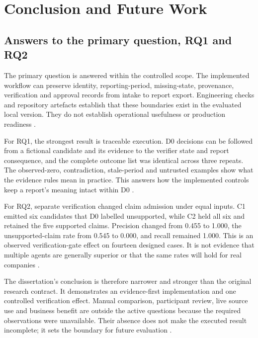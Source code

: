 \chapter{Conclusion and Future Work}
\section{Answers to the primary question, RQ1 and RQ2}

The primary question is answered within the controlled scope. The implemented workflow can preserve
identity, reporting-period, missing-state, provenance, verification and approval records from intake
to report export. Engineering checks and repository artefacts establish that these boundaries exist in
the evaluated local version. They do not establish operational usefulness or production readiness
\citep{hevner2004design,peffers2007dsrm}.

For RQ1, the strongest result is traceable execution. D0 decisions can be followed from a fictional
candidate and its evidence to the verifier state and report consequence, and the complete outcome list
was identical across three repeats. The observed-zero, contradiction, stale-period and untrusted
examples show what the evidence rules mean in practice. This answers how the implemented controls
keep a report's meaning intact within D0 \citep{gao2023alce,gao2023rarr,pineau2021reproducibility}.

For RQ2, separate verification changed claim admission under equal inputs. C1 emitted six candidates
that D0 labelled unsupported, while C2 held all six and retained the five supported claims. Precision
changed from 0.455 to 1.000, the unsupported-claim rate from 0.545 to 0.000, and recall remained 1.000.
This is an observed verification-gate effect on fourteen designed cases. It is not evidence that
multiple agents are generally superior or that the same rates will hold for real companies
\citep{guo2024multiagent,kapoor2023leakage}.

The dissertation's conclusion is therefore narrower and stronger than the original research
contract. It demonstrates an evidence-first implementation and one controlled verification effect.
Manual comparison, participant review, live source use and business benefit are outside the active
questions because the required observations were unavailable. Their absence does not make the
executed result incomplete; it sets the boundary for future evaluation
\citep{hevner2004design,pineau2021reproducibility}.

